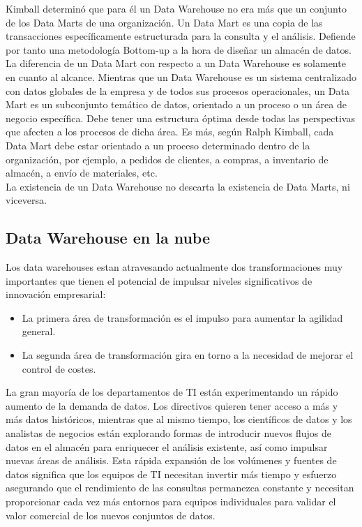 \documentclass[%
 reprint,
 amsmath,amssymb,
 aps,
]{revtex4-1}
\begin{document}
\begin{itemize}
Kimball determinó que para él un Data Warehouse no era más que un conjunto de los Data Marts de una organización. Un Data Mart es una copia de las transacciones específicamente estructurada para la consulta y el análisis. Defiende por tanto una metodología Bottom-up a la hora de diseñar un almacén de datos.\\

La diferencia de un Data Mart con respecto a un Data Warehouse es solamente en cuanto al alcance. Mientras que un Data Warehouse es un sistema centralizado con datos globales de la empresa y de todos sus procesos operacionales, un Data Mart es un subconjunto temático de datos, orientado a un proceso o un área de negocio específica. Debe tener una estructura óptima desde todas las perspectivas que afecten a los procesos de dicha área. Es más, según Ralph Kimball, cada Data Mart debe estar orientado a un proceso determinado dentro de la organización, por ejemplo, a pedidos de clientes, a compras, a inventario de almacén, a envío de materiales, etc.\\

 La existencia de un Data Warehouse no descarta la existencia de Data Marts, ni viceversa.  \cite{estrella1}

\end{itemize}





\subsection{Data Warehouse en la nube}

Los data warehouses estan atravesando actualmente dos transformaciones muy importantes que tienen el potencial de impulsar niveles significativos de innovación empresarial:


\begin{itemize}
	\item La primera área de transformación es el impulso para aumentar la agilidad general.
	\item La segunda área de transformación gira en torno a la necesidad de mejorar el control de costes.
\end{itemize}

La gran mayoría de los departamentos de TI están experimentando un rápido aumento de la demanda de datos. Los directivos quieren tener acceso a más y más datos históricos, mientras que al mismo tiempo, los científicos de datos y los analistas de negocios están explorando formas de introducir nuevos flujos de datos en el almacén para enriquecer el análisis existente, así como impulsar nuevas áreas de análisis. Esta rápida expansión de los volúmenes y fuentes de datos significa que los equipos de TI necesitan invertir más tiempo y esfuerzo asegurando que el rendimiento de las consultas permanezca constante y necesitan proporcionar cada vez más entornos para equipos individuales para validar el valor comercial de los nuevos conjuntos de datos.\\
\end{document}
